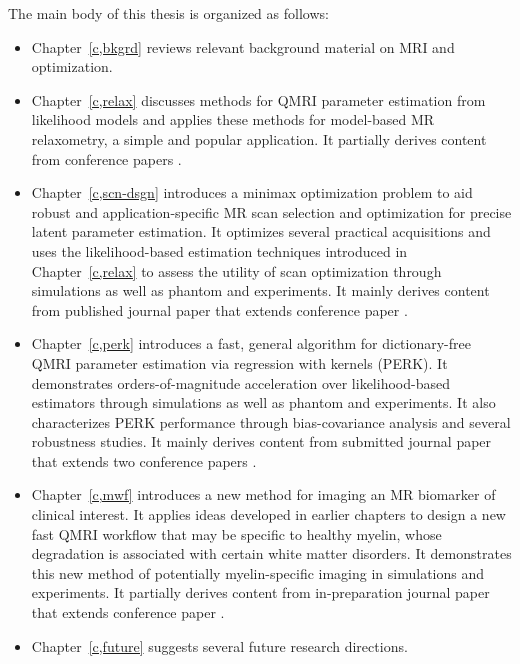 The main body of this thesis is organized as follows:
\begin{itemize}
\setlength\itemsep{0.5em}
	\item{%
		Chapter~\ref{c,bkgrd} reviews 
		relevant background material
		on MRI and optimization.
	}%
	\item{%
		Chapter~\ref{c,relax} discusses methods 
		for QMRI parameter estimation 
		from likelihood models 
		and applies these methods 
		for model-based MR relaxometry,
		a simple and popular application.
		It partially derives content
		from conference papers 
		\cite{nataraj:14:rje,nataraj:14:mbe}.
	}%
	\item{%
		Chapter~\ref{c,scn-dsgn} introduces
		a minimax optimization problem
		to aid robust and application-specific 
		MR scan selection and optimization 
		for precise latent parameter estimation.
		It optimizes several practical acquisitions 
		and uses the likelihood-based estimation techniques 
		introduced in Chapter~\ref{c,relax}
		to assess the utility
		of scan optimization
		through simulations 
		as well as phantom and \invivo experiments.
		It mainly derives content
		from published journal paper
		\cite{nataraj:17:oms}
		that extends conference paper
		\cite{nataraj:15:amm}.
	}%
	\item{%
		Chapter~\ref{c,perk} introduces
		a fast, general algorithm
		for dictionary-free QMRI parameter estimation
		via regression with kernels (PERK).
		It demonstrates orders-of-magnitude acceleration 
		over likelihood-based estimators
		through simulations
		as well as phantom and \invivo experiments.
		It also characterizes PERK performance
		through bias-covariance analysis 
		and several robustness studies.
		It mainly derives content 
		from submitted journal paper
		\cite{nataraj::dfm} 
		that extends two conference papers
		\cite{nataraj:17:dfm,nataraj:17:slw}.
	}%
	\item{%
		Chapter~\ref{c,mwf} introduces a new method 
		for imaging an MR biomarker of clinical interest. 
		It applies ideas 
		developed in earlier chapters
		to design a new fast QMRI workflow
		that may be specific to healthy myelin,
		whose degradation is associated
		with certain white matter disorders.
		It demonstrates this new method 
		of potentially myelin-specific imaging
		in simulations and \invivo experiments.
		It partially derives content 
		from in-preparation journal paper \cite{nataraj::fmw}
		that extends conference paper \cite{nataraj:17:mwf}.
	}%
	\item{%
		Chapter~\ref{c,future} suggests 
		several future research directions.
	}%
\end{itemize}
